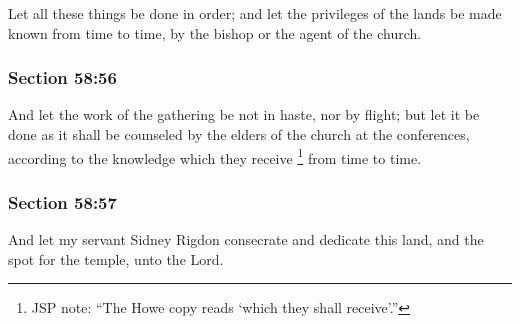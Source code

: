 		Let all these things be done in order; and let the privileges of the lands be made known from time to time, by the bishop or the agent of the church.


	\subsubsection{Section 58:56} %
		\label{DC58-56}

		And let the work of the gathering be not in haste, nor by flight; but let it be done as it shall be counseled by the elders of the church at the conferences, according to the knowledge which they receive%
			\footnote{%
				JSP note: ``The Howe copy reads `which they shall receive'.''
				}
		from time to time.


	\subsubsection{Section 58:57} %
		\label{DC58-57}

		And let my servant Sidney Rigdon consecrate and dedicate this land, and the spot for the temple, unto the Lord.


